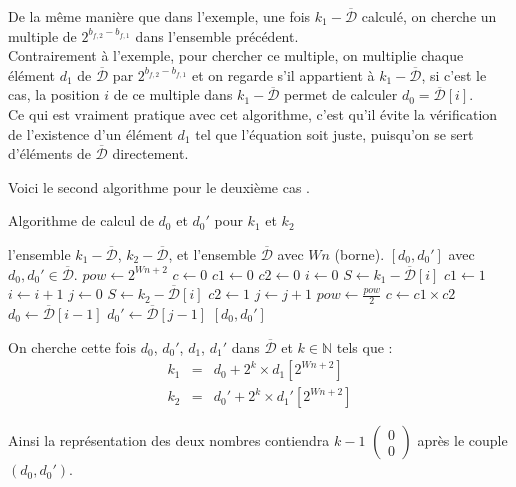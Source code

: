 \documentclass[12pt, a4paper]{memoir}
\newcommand{\doublezero}{\begin{pmatrix} 0 \\ 0 \end{pmatrix}}
\newcommand{\dbarre}{\overline{\mathcal{D}}}
\begin{document}
De la même manière que dans l'exemple, une fois $k_1 - \dbarre$ calculé, on cherche un multiple de $2^{b_{f,2} - b_{f,1}}$
dans l'ensemble précédent. \\
Contrairement à l'exemple, pour chercher ce multiple, on multiplie chaque élément $d_1$ de $\dbarre$ par $2^{b_{f,2} - b_{f,1}}$ et on regarde s'il
appartient à $k_1 - \dbarre$, si c'est le cas, la position $i$ de ce multiple dans $k_1 - \dbarre$ permet de 
calculer $d_0 = \dbarre[i]$. \\
Ce qui est vraiment pratique avec cet algorithme, c'est qu'il évite la vérification de l'existence d'un élément $d_1$ tel que
l'équation soit juste, puisqu'on se sert d'éléments de $\dbarre$ directement.
 
Voici le second algorithme pour le deuxième cas .
\begin{algorithm}
 \caption{Algorithme de calcul de $d_0$ et $d_0'$ pour $k_1$ et $k_2$}
 \begin{algorithmic}
  \REQUIRE l'ensemble $k_1 - \dbarre$, $k_2 - \dbarre$, et l'ensemble $\dbarre$ avec $Wn$ (borne).
  \ENSURE $[d_0,d_0']$ avec $d_0, d_0' \in \dbarre$.
  \STATE $pow \leftarrow 2^{Wn+2}$
  \STATE $c \leftarrow 0$
  \STATE $c1 \leftarrow 0$
  \STATE $c2 \leftarrow 0$
  \STATE $i \leftarrow 0$
  \WHILE{$i < |\dbarre|$ et $c_1 \neq 1$}
  \STATE $S \leftarrow k_1 - \dbarre[i]$
  \STATE $c1 \leftarrow 1$
  \ENDIF
  \STATE $i \leftarrow i+1$
  \ENDWHILE
  \STATE $j \leftarrow 0$
  \WHILE{$j < |\dbarre|$ et $c_2 \neq 1$}
  \STATE $S \leftarrow k_2 - \dbarre[i]$
  \STATE $c2 \leftarrow 1$
  \ENDIF
  \STATE $j \leftarrow j+1$
  \ENDWHILE
  \STATE $pow \leftarrow \frac{pow}{2}$
  \STATE $c \leftarrow c1 \times c2$
  \ENDWHILE
  \STATE $d_0 \leftarrow \dbarre[i-1]$
  \STATE $d_0' \leftarrow \dbarre[j-1]$
  \RETURN $[d_0,d_0']$
 \end{algorithmic}
\end{algorithm}

On cherche cette fois $d_0$, $d_0'$, $d_1$, $d_1'$ dans $\dbarre$ et $k \in \mathbb{N}$ tels que : \\
 $$\begin{array}{ccc}
k_1 & = & d_0 + 2^k \times d_1[2^{Wn+2}] \\
k_2 & = & d_0' + 2^k \times d_1'[2^{Wn+2}]
   \end{array}$$

Ainsi la représentation des deux nombres contiendra $k-1$ $\doublezero$ après le couple $(d_0,d_0')$.
\end{document}
